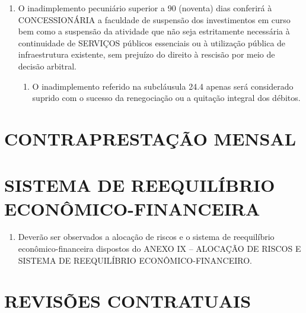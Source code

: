 \documentclass[a4paper,11pt]{report} %
\begin{document}
\begin{enumerate}
\item \label{itm:PKGQ} O inadimplemento pecuniário superior a 90 (noventa) dias conferirá à CONCESSIONÁRIA a faculdade de suspensão dos investimentos em curso bem como a suspensão da atividade que não seja estritamente necessária à continuidade de SERVIÇOS públicos essenciais ou à utilização pública de infraestrutura existente, sem prejuízo do direito à rescisão por meio de decisão arbitral.

\begin{enumerate}[label*=\arabic*.]
\item \label{itm:AAR9} O inadimplemento referido na subcláusula 24.4 apenas será considerado suprido com o sucesso da renegociação ou a quitação integral dos débitos.
\end{enumerate}
\end{enumerate}

\section{CONTRAPRESTAÇÃO MENSAL}
\label{sec:H7QB}
\begin{enumerate}
\end{enumerate}

\section{SISTEMA DE REEQUILÍBRIO ECONÔMICO-FINANCEIRA}
\label{sec:XH22}

\begin{enumerate}
\item \label{itm:Z768} Deverão ser observados a alocação de riscos e o sistema de reequilíbrio econômico-financeira dispostos do ANEXO IX – ALOCAÇÃO DE RISCOS E SISTEMA DE REEQUILÍBRIO ECONÔMICO-FINANCEIRO.
\end{enumerate}

\section{REVISÕES CONTRATUAIS}
\label{sec:ZHJP}
\end{document}
